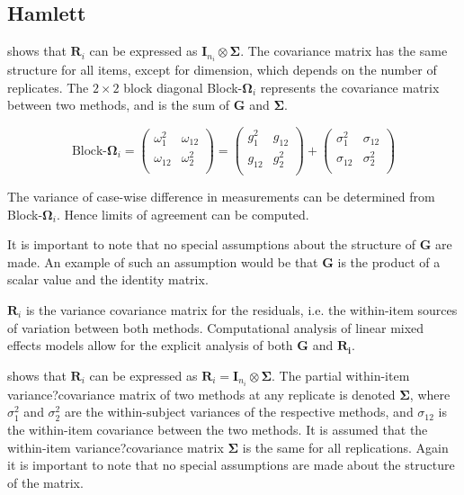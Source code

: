 \documentclass[12pt, a4paper]{report}
\theoremstyle{plain}
\theoremstyle{definition}
\theoremstyle{remark}
\begin{document}
\subsection{Hamlett}
\citet{hamlett} shows that $\boldsymbol{R}_{i}$  can be expressed as $\boldsymbol{I}_{n_{i}} \otimes \boldsymbol{\Sigma}$. The covariance matrix has the same structure for all items, except for dimension, which depends on the number of replicates. The $2 \times 2$ block diagonal Block-$\boldsymbol{\Omega}_{i}$ represents the covariance matrix between two methods, and is the sum of $\boldsymbol{G}$ and $\boldsymbol{\Sigma}$.

\[ \textrm{Block-}\boldsymbol{\Omega}_{i}  = \left(\begin{array}{cc}
\omega^2_1  & \omega_{12} \\
\omega_{12} & \omega^2_2 \\
\end{array}  \right)
=  \left(
\begin{array}{cc}
g^2_1  & g_{12} \\
g_{12} & g^2_2 \\
\end{array} \right)+
\left(
\begin{array}{cc}
\sigma^2_1  & \sigma_{12} \\
\sigma_{12} & \sigma^2_2 \\
\end{array}\right)
\]

The variance of case-wise difference in measurements can be determined from Block-$\boldsymbol{\Omega}_{i}$. Hence limits of agreement can be computed.

It is important to note that no special assumptions about the structure of $\boldsymbol{G}$ are made. An example of such an assumption would be that $\boldsymbol{G}$ is the product of a scalar value and the identity matrix.

$\boldsymbol{R}_{i}$ is the variance covariance matrix for the residuals, i.e. the within-item sources of variation between both methods. Computational analysis of linear mixed effects models allow for the explicit analysis of both $\boldsymbol{G}$ and $\boldsymbol{R_i}$.

\citet{hamlett} shows that $\boldsymbol{R}_{i}$  can be expressed as $\boldsymbol{R}_{i} = \boldsymbol{I}_{n_{i}} \otimes \boldsymbol{\Sigma}$. The partial within-item variance?covariance matrix of two methods at any replicate is denoted $\boldsymbol{\Sigma}$, where $\sigma^2_{1}$ and $\sigma^2_{2}$ are the within-subject variances of the respective methods, and $\sigma_{12}$ is the within-item covariance between the two methods. It is assumed that the within-item variance?covariance matrix $\boldsymbol{\Sigma}$ is the same for all replications. Again it is important to note that no special assumptions are made about the structure of the matrix.
\end{document}
